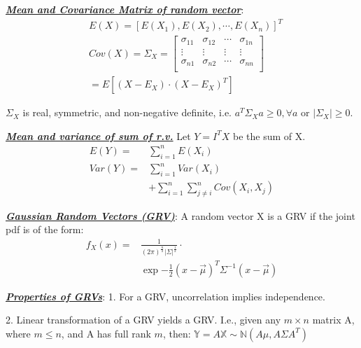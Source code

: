 \documentclass[12pt]{article}
\newcommand{\bulletPoint}[1]{\ul{\textit{\textbf{#1}}}}
\begin{document}
\begin{multicols*}{4}
\bulletPoint{Mean and Covariance Matrix of random vector}:
\useshortskip\begin{equation*}
    \begin{split}
        & E(X) = [E(X_1), E(X_2), \cdots, E(X_n)]^T\\
        & Cov(X) = \Sigma_X = 
        \begin{bmatrix}
        \sigma_{11} & \sigma_{12} & \cdots & \sigma_{1n}\\
        \vdots & \vdots & \vdots & \vdots \\
        \sigma_{n1} & \sigma_{n2} & \cdots & \sigma_{nn}\\
        \end{bmatrix}\\
        & = E[(X-E_X)\cdot(X-E_X)^T]
    \end{split}
\end{equation*}

$\Sigma_X$ is real, symmetric, and non-negative definite, i.e. $a^T\Sigma_Xa \geq 0, \forall a$ or $|\Sigma_X| \geq 0$.


\bulletPoint{Mean and variance of sum of r.v.}
Let $Y=I^TX$ be the sum of X.
\useshortskip \begin{equation*}
    \begin{split}
        E(Y) = & \sum^n_{i=1}E(X_i)\\
        Var(Y) = & \sum^n_{i=1}Var(X_i) \\
        & + \sum^n_{i=1}\sum^n_{j\neq i}Cov(X_i, X_j)
    \end{split}
\end{equation*}


\bulletPoint{Gaussian Random Vectors (GRV)}:
A random vector X is a GRV if the joint pdf is of the form:
\useshortskip \begin{equation*}
    \begin{split}
        f_X(x) = & \frac{1}{(2\pi)^{\frac{n}{2}}|\Sigma|^{\frac{1}{2}}}\cdot\\
        & \exp{-\frac{1}{2}(x-\Vec{\mu})^T\Sigma^{-1}(x-\Vec{\mu})}
    \end{split}
\end{equation*}


\bulletPoint{Properties of GRVs}:
1. For a GRV, uncorrelation implies independence.

2. Linear transformation of a GRV yields a GRV. I.e., given any $m \times n$ matrix A, where $m \leq n$, and A has full rank $m$, then: $\mathbb{Y} = A\mathbb{X} \sim \mathbb{N}(A\mathbb{\mu}, A\Sigma A^T)$


\end{multicols*}
\end{document}
